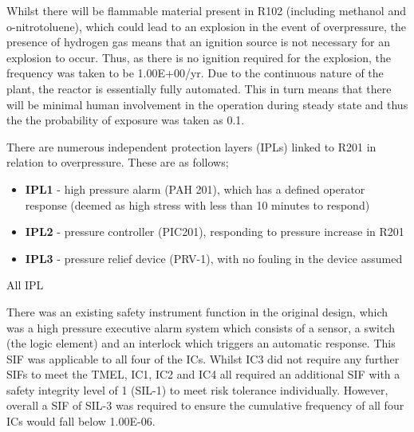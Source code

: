 Whilst there will be flammable material present in R102 (including methanol and o-nitrotoluene), which could lead to an explosion in the event of overpressure, the presence of hydrogen gas means that an ignition source is not necessary for an explosion to occur. Thus, as there is no ignition required for the explosion, the frequency was taken to be 1.00E+00/yr. Due to the continuous nature of the plant, the reactor is essentially fully automated. This in turn means that there will be minimal human involvement in the operation during steady state and thus the the probability of exposure was taken as 0.1. 

There are numerous  independent protection layers (IPLs) linked to R201 in relation to overpressure. These are as follows;
 
 \begin{itemize}
\item \textbf{IPL1} - high pressure alarm (PAH 201), which has a defined operator response (deemed as high stress with less than 10 minutes to respond)
\item  \textbf{IPL2} - pressure controller (PIC201), responding to pressure increase in R201
\item  \textbf{IPL3} - pressure relief device (PRV-1), with no fouling in the device assumed
 \end{itemize}

All IPL



There was an existing safety instrument function in the original design, which was a high pressure executive alarm system which consists of a sensor, a switch (the logic element) and an interlock which triggers an automatic response. This SIF was applicable to all four of the ICs. Whilst IC3 did not require any further SIFs to meet the TMEL, IC1, IC2 and IC4 all required an additional SIF with a safety integrity level of 1 (SIL-1) to meet  risk tolerance individually. However, overall a SIF of SIL-3 was required to ensure the cumulative frequency of all four ICs would fall below 1.00E-06. 












 